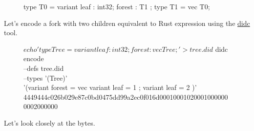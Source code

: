 \documentclass{article}
\begin{document}
\begin{figure}

\begin{code}[candid]
type T0 = variant { leaf : int32; forest : T1 };
type T1 = vec T0;
\end{code}
\end{figure}

Let's encode a fork with two children equivalent to  Rust expression using the \href{https://github.com/dfinity/candid/tree/f7166f47d895e411a74de1eba4b347ac75f5fd26/tools/didc}{didc} tool.

\begin{figure}
\begin{code}[shell]
$ echo 'type Tree = variant { leaf : int32; forest : vec Tree };' > tree.did
$ didc encode \\
       --defs   tree.did \\
       --types  '(Tree)' \\
       '(variant { forest = vec { variant { leaf = 1 }; variant { leaf = 2 } } })'
4449444c026b029e87c0bd0475dd99a2ec0f016d000100010200010000000002000000
\end{code}
\end{figure}

Let's look closely at the bytes.
\end{document}
